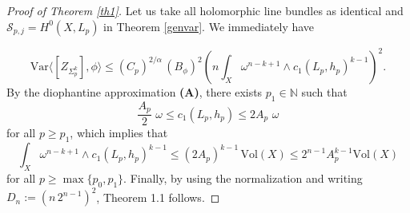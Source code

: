 \documentclass[10pt,a4paper]{amsart}
\begin{document}
 \begin{proof}[Proof of Theorem \ref{th1}]
 Let us take all holomorphic line bundles as identical and $\mathcal{S}_{p, j}= H^{0}(X, L_{p})$ in Theorem \ref{genvar}. We immediately have

 \begin{equation} \label{spevar}
  \mathrm{Var} \langle [Z_{\Sigma_{p}^{k}}], \phi \rangle \leq (C_{p})^{2/\alpha}\,(B_{\phi})^{2}(n \int_{X}{\omega^{n-k+1} \wedge c_{1}(L_{p}, h_{p})^{k-1}})^{2}.
 \end{equation}By the diophantine approximation \textbf{(A)}, there exists $p_{1} \in \mathbb{N}$ such that
 \begin{equation*}\label{cur1}\frac{A_{p}}{2}\,\, \omega \leq c_{1}(L_{p}, h_{p}) \leq 2A_{p}\,\, \omega \end{equation*} for all $p \geq p_{1}$, which implies that \begin{equation}\label{voll}\int_{X}{\omega^{n-k+1}\wedge c_{1}(L_{p}, h_{p})^{k-1}}\leq (2A_{p})^{k-1} \,\mathrm{Vol}(X) \leq 2^{n-1} A^{k-1}_{p} \mathrm{Vol}(X)\end{equation} for all $p \geq \max\{p_0, p_1\}$. Finally, by using the normalization and writing $D_{n}:= (n \,2^{n-1})^{2}$, Theorem 1.1 follows.

 \end{proof}
\end{document}
